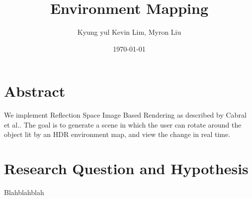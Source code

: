 \documentclass[12pt]{article}
\begin{document}
\title{Environment Mapping}
\author{Kyung yul Kevin Lim, Myron Liu}
\date{\today}
\maketitle

\section{Abstract}
We implement Reflection Space Image Based Rendering as described by Cabral et al.\cite{cabral1999reflection}. The goal is to generate a scene in which the user can rotate around the object lit by an HDR environment map, and view the change in real time.

\section{Research Question and Hypothesis}
Blahblahblah



\end{document}
